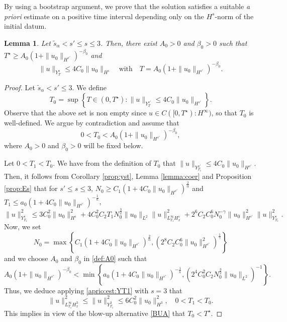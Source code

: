 \documentclass{amsart}
\newtheorem{lemma}[theorem]{Lemma}
\theoremstyle{definition}
\theoremstyle{remark}
\numberwithin{equation}{section}
\begin{document}
By using a bootstrap argument, we prove that the solution satisfies a suitable \emph{a priori} estimate
on a positive time interval depending only on the $H^s$-norm of the initial datum.

\begin{lemma} \label{apriori:smooth}
 Let $\widetilde{s}_{\alpha}<s' \le s \le 3$. Then, there exist $A_0>0$ and $\beta_0>0$ such that $T^\star \ge A_0 (1+\|u_0\|_{H^{s'}})^{-\beta_0}$ and 
\begin{equation} \label{apriori:smooth.1}
\|u\|_{Y^{s}_T} \le 4C_0\|u_0\|_{H^{s}} \quad \text{with} \quad T= A_0 (1+\|u_0\|_{H^{s'}})^{-\beta_0}. 
\end{equation}
\end{lemma}

\begin{proof} Let $\widetilde{s}_{\alpha}<{s'} \le 3$. We define 
\begin{equation} \label{BS}
T_0=\sup \left\{ T \in (0,T^\star) : \|u\|_{Y^{s'}_T} \le 4C_0\|u_0\|_{H^{s'}} \right\} .
\end{equation}
Observe that the above set is non empty since $u \in  C([0,T^\star) : H^\infty)$, so that $T_0$ is well-defined. We argue by contradiction and assume that 
\begin{equation} \label{def:A0}
0<T_0< A_0 (1+\|u_0\|_{H^{s'}})^{-\beta_0}, 
\end{equation}
where $A_0>0$ and $\beta_0>0$ will be fixed below. 

Let $0<T_1<T_0$. We have from the definition of $T_0$ that $\|u\|_{Y_{T_1}^{s'}} \le 4C_0\|u_0\|_{H^{s'}}$. Then, it follows from Corollary \ref{prop:yst}, Lemma \ref{lemma:coer} and Proposition \ref{prop:Es} that for $s' \le s \le 3$, $N_0 \ge C_1 \left(1+4C_0\|u_0\|_{H^{s'}} \right)^{\frac2{\alpha}}$ and $T_1 \le a_0 (1+4C_0\|u_0\|_{H^{s'}})^{-\frac1\kappa}$,
\begin{equation} \label{aprio:est:YT1}
\|u\|_{Y_{T_1}^{s}}^2 \le 3C_0^2\|u_0\|_{H^{s}}^2+4C_0^2C_2T_1N_0^{\frac32}\|u_0\|_{L^2}\|u\|_{L^\infty_{T_1}H^{s}_x}^2 +
2^6C_2C_0^6N_0^{-\gamma} \|u_0\|_{H^{s'}}^2\|u\|_{Y_{T_1}^{s}}^2 .
\end{equation}
Now, we set
\[N_0=\max\left\{C_1 \left(1+4C_0\|u_0\|_{H^{s'}} \right)^{\frac2{\alpha}},(2^8C_2C_0^6 \|u_0\|_{H^{s'}}^2)^{\frac1{\gamma}} \right\} \]
and we choose $A_0$ and $\beta_0$ in \eqref{def:A0} such that 
\[A_0 (1+\|u_0\|_{H^{s'}})^{-\beta_0} < \min\left\{ a_0 (1+4C_0\|u_0\|_{H^{s'}})^{-\frac1\kappa}, (2^4C_0^2C_2N_0^\frac32 \|u_0\|_{L^2})^{-1}\right\} . \]
Thus, we deduce applying \eqref{aprio:est:YT1} with $s=3$ that 
\[\|u\|_{L^\infty_{T_1}H^{3}_x}^2 \le  \|u\|_{Y_{T_1}^{3}}^2 \le 6C_0^2 \|u_0\|_{H^{3}}^2, \quad 0<T_1<T_0 . \]
This implies in view of the blow-up alternative \eqref{BUA} that $T_0<T^\star$. 


\end{proof}
\end{document}
